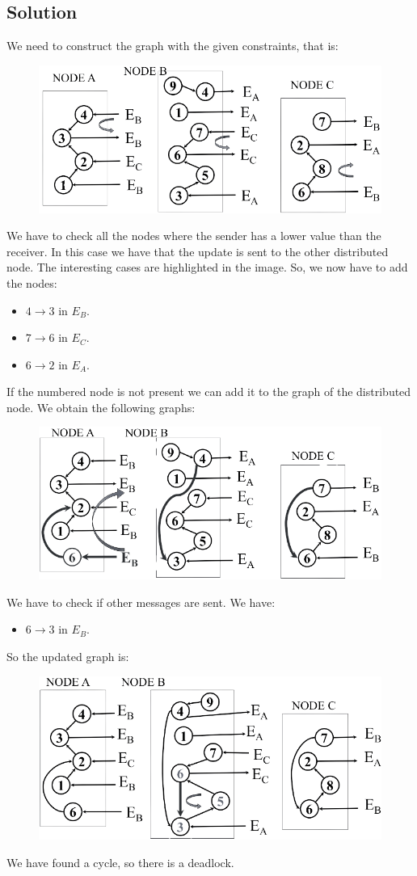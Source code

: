 \documentclass[12pt, a4paper]{report}
\begin{document}
    \subsection*{Solution}
        We need to construct the graph with the given constraints, that is: 
        \begin{figure}[H]
            \centering
            \includegraphics[width=0.6\linewidth]{images/Ob1.png}
        \end{figure}
        We have to check all the nodes where the sender has a lower value than the receiver. In this case we have that the update is sent to the 
        other distributed node. The interesting cases are highlighted in the image. So, we now have to add the nodes: 
        \begin{itemize}
            \item $4 \rightarrow 3$ in $E_B$. 
            \item $7 \rightarrow 6$ in $E_C$. 
            \item $6 \rightarrow 2$ in $E_A$. 
        \end{itemize}
        If the numbered node is not present we can add it to the graph of the distributed node. We obtain the following graphs: 
        \begin{figure}[H]
            \centering
            \includegraphics[width=0.6\linewidth]{images/Ob2.png}
        \end{figure}
        We have to check if other messages are sent. We have:
        \begin{itemize}
            \item $6 \rightarrow 3$ in $E_B$. 
        \end{itemize}
        So the updated graph is: 
        \begin{figure}[H]
            \centering
            \includegraphics[width=0.6\linewidth]{images/Ob3.png}
        \end{figure}
        We have found a cycle, so there is a deadlock. 
\end{document}
